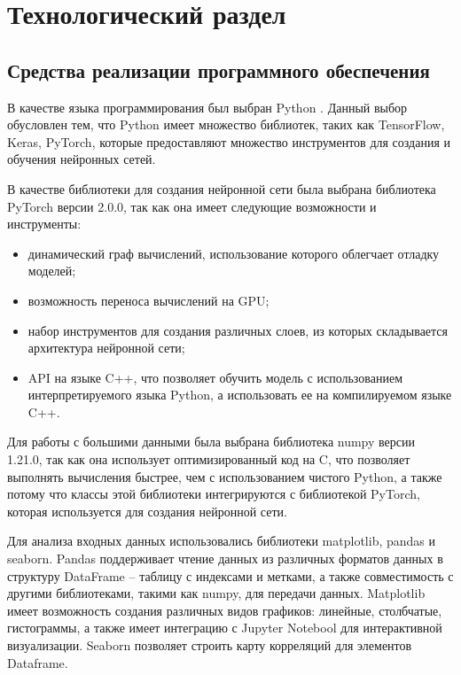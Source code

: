 \chapter{Технологический раздел}

\section{Средства реализации программного обеспечения}

В качестве языка программирования был выбран Python \cite{Python}. Данный выбор обусловлен тем, что Python имеет множество библиотек, таких как TensorFlow, Keras, PyTorch, которые предоставляют множество инструментов для создания и обучения нейронных сетей.

В качестве библиотеки для создания нейронной сети была выбрана библиотека PyTorch \cite{PyTorch} версии 2.0.0, так как она имеет следующие возможности и инструменты:
\begin{itemize}
	\item динамический граф вычислений, использование которого облегчает отладку моделей;
	\item возможность переноса вычислений на GPU;
	\item набор инструментов для создания различных слоев, из которых складывается архитектура нейронной сети;
	\item API на языке C++, что позволяет обучить модель с использованием интерпретируемого языка Python, а использовать ее на компилируемом языке C++.
\end{itemize}

Для работы с большими данными была выбрана библиотека numpy версии 1.21.0, так как она использует оптимизированный код на C, что позволяет выполнять вычисления быстрее, чем с использованием чистого Python, а также потому что классы этой библиотеки интегрируются с библиотекой PyTorch, которая используется для создания нейронной сети.

Для анализа входных данных использовались библиотеки matplotlib, pandas и seaborn.
Pandas поддерживает чтение данных из различных форматов данных в структуру DataFrame -- таблицу с индексами и метками, а также совместимость с другими библиотеками, такими как numpy, для передачи данных.
Matplotlib имеет возможность создания различных видов графиков: линейные, столбчатые, гистограммы, а также имеет интеграцию с Jupyter Notebool для интерактивной визуализации.
Seaborn позволяет строить карту корреляций для элементов Dataframe.

